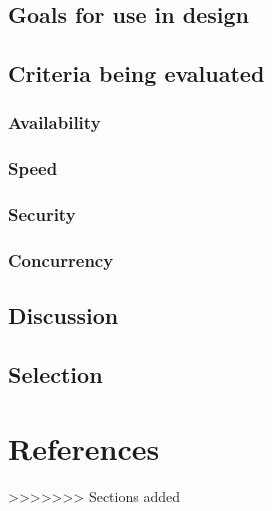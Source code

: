 \documentclass[10pt,letterpaper,onecolumn,draftclsnofoot]{IEEEtran}
\begin{document}
\subsubsection{}

\subsection{Goals for use in design}

\subsection{Criteria being evaluated}

\subsubsection{Availability}

\subsubsection{Speed}

\subsubsection{Security}

\subsubsection{Concurrency}

\subsection{Discussion}

\subsection{Selection}



\section{References}
>>>>>>> Sections added



\end{document}
